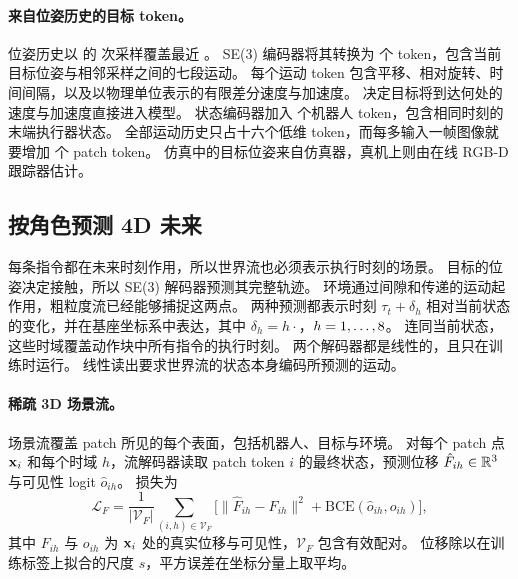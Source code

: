 \paragraph{来自位姿历史的目标 token。}
位姿历史以 \cfgControlRate{} 的 \cfgHistoryLen{} 次采样覆盖最近 \cfgHistorySpan{}。
SE(3) 编码器将其转换为 \cfgHistoryLen{} 个 token，包含当前目标位姿与相邻采样之间的七段运动。
每个运动 token 包含平移、相对旋转、时间间隔，以及以物理单位表示的有限差分速度与加速度。
决定目标将到达何处的速度与加速度直接进入模型。
状态编码器加入 \cfgHistoryLen{} 个机器人 token，包含相同时刻的末端执行器状态。
全部运动历史只占十六个低维 token，而每多输入一帧图像就要增加 \cfgPatches{} 个 patch token。
仿真中的目标位姿来自仿真器，真机上则由在线 RGB-D 跟踪器估计。

\subsection{按角色预测 4D 未来}
\label{sec:predict}

每条指令都在未来时刻作用，所以世界流也必须表示执行时刻的场景。
目标的位姿决定接触，所以 SE(3) 解码器预测其完整轨迹。
环境通过间隙和传递的运动起作用，粗粒度流已经能够捕捉这两点。
两种预测都表示时刻 $\tau_t+\delta_h$ 相对当前状态的变化，并在基座坐标系中表达，其中 $\delta_h=h\cdot$\cfgHorizonStep{}，$h=1,\ldots,8$。
连同当前状态，这些时域覆盖动作块中所有指令的执行时刻。
两个解码器都是线性的，且只在训练时运行。
线性读出要求世界流的状态本身编码所预测的运动。

\paragraph{稀疏 3D 场景流。}
场景流覆盖 patch 所见的每个表面，包括机器人、目标与环境。
对每个 patch 点 $\mathbf{x}_i$ 和每个时域 $h$，流解码器读取 patch token $i$ 的最终状态，预测位移 $\hat F_{ih}\in\mathbb{R}^3$ 与可见性 logit $\hat o_{ih}$。
损失为
\begin{equation}
\mathcal L_F=\frac1{|\mathcal V_F|}\sum_{(i,h)\in\mathcal V_F}\!
\big[\|\hat F_{ih}-F_{ih}\|^2+\mathrm{BCE}(\hat o_{ih},o_{ih})\big],
\label{eq:flowloss}
\end{equation}
其中 $F_{ih}$ 与 $o_{ih}$ 为 $\mathbf{x}_i$ 处的真实位移与可见性，$\mathcal V_F$ 包含有效配对。
位移除以在训练标签上拟合的尺度 $s$，平方误差在坐标分量上取平均。

